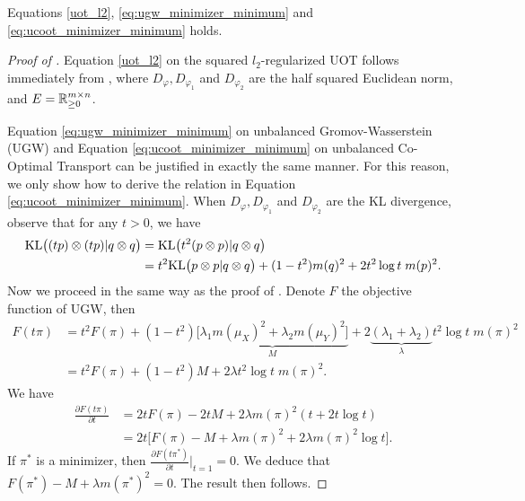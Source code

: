 \begin{corollary}
  \label{coro:conseq}
  Equations \eqref{uot_l2}, \eqref{eq:ugw_minimizer_minimum} and \eqref{eq:ucoot_minimizer_minimum}
  holds.
\end{corollary}
\begin{proof}[Proof of ]
  Equation \eqref{uot_l2} on the squared $l_2$-regularized UOT follows immediately from ,
  where $D_{\varphi}, D_{\varphi_1}$ and $D_{\varphi_2}$ are the half squared Euclidean norm,
  and $E = \mathbb R^{m \times n}_{\geq 0}$.

  Equation \eqref{eq:ugw_minimizer_minimum} on unbalanced Gromov-Wasserstein (UGW) and
  Equation \eqref{eq:ucoot_minimizer_minimum} on unbalanced Co-Optimal Transport can be
  justified in exactly the same manner. For this reason, we only show how to derive the relation in
  Equation \eqref{eq:ucoot_minimizer_minimum}. When $D_{\varphi}, D_{\varphi_1}$ and $D_{\varphi_2}$
  are the KL divergence, observe that for any $t > 0$, we have
  \begin{align}
    \text{KL}\big( (tp) \otimes (tp) | q \otimes q \big) &= \text{KL}\big( t^2 (p \otimes p) | q \otimes q \big) \\
    &= t^2 \text{KL}\big( p \otimes p | q \otimes q \big) + (1 - t^2) m(q)^2 + 2 t^2 \log t \; m(p)^2.
  \end{align}
  Now we proceed in the same way as the proof of . Denote $F$ the objective function
  of UGW, then
  \begin{align}
    F(t\pi) &= t^2 F(\pi) + (1 - t^2) \underbrace{\big[\lambda_1 m(\mu_X)^2 + \lambda_2 m(\mu_Y)^2 \big]}_{M}
    + 2 \underbrace{(\lambda_1 + \lambda_2)}_{\lambda} t^2 \log t \; m(\pi)^2 \\
    &= t^2 F(\pi) + (1 - t^2) M + 2 \lambda t^2 \log t \; m(\pi)^2.
  \end{align}
  We have
  \begin{align}
    \frac{\partial F(t\pi)}{\partial t} &= 2t F(\pi) - 2t M + 2 \lambda m(\pi)^2 (t + 2t \log t) \\
    &= 2t \big[ F(\pi) - M + \lambda m(\pi)^2 + 2 \lambda m(\pi)^2 \log t \big].
  \end{align}
  If $\pi^*$ is a minimizer, then $\frac{\partial F(t\pi^*)}{\partial t} \Big |_{t = 1} = 0$.
  We deduce that $F(\pi^*) - M + \lambda m(\pi^*)^2 = 0$. The result then follows.
\end{proof}


